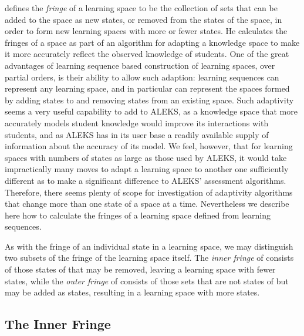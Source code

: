 \documentclass[11pt]{llncs}
\begin{document}
{\citet{Thi-01} defines the \emph{fringe} of a learning space to be the collection of sets that can be added to the space as new states, or removed from the states of the space, in order to form new learning spaces with more or fewer states. He calculates the fringes of a space as part of an algorithm for adapting a knowledge space to make it more accurately reflect the observed knowledge of students. One of the great advantages of learning sequence based construction of learning spaces, over partial orders, is their ability to allow such adaption: learning sequences can represent any learning space, and in particular can represent the spaces formed by adding states to and removing states from an existing space. Such adaptivity seems a very useful capability to add to ALEKS, as a knowledge space that more accurately models student knowledge would improve its interactions with students, and as ALEKS has in its user base a readily available supply of information about the accuracy of its model. We feel, however, that for learning spaces with numbers of states as large as those used by ALEKS, it would take impractically many moves to adapt a learning space to another one sufficiently different as to make a significant difference to ALEKS' assessment algorithms. Therefore, there seems plenty of scope for investigation of adaptivity algorithms that change more than one state of a space at a time. Nevertheless we describe here how to calculate the fringes of a learning space defined from learning sequences.

As with the fringe of an individual state in a learning space, we may distinguish two subsets of the fringe of the learning space itself.  The \emph{inner fringe} of  consists of those states of  that may be removed, leaving a learning space with fewer states, while the \emph{outer fringe} of  consists of those sets that are not states of  but may be added as states, resulting in a learning space with more states.

\subsection{The Inner Fringe}

}
\end{document}
